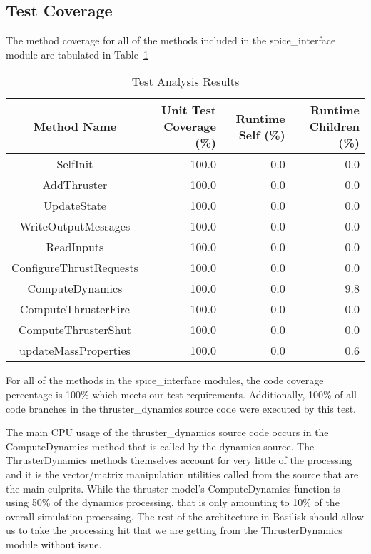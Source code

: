 \subsection{Test Coverage}
The method coverage for all of the methods included in the spice\_interface 
module are tabulated in Table~\ref{tab:cov_met}

\begin{table}[htbp]
	\caption{Test Analysis Results}
	\label{tab:cov_met}
	\centering \fontsize{10}{10}\selectfont
	\begin{tabular}{c | r | r | r} %
		\hline
		Method Name    & Unit Test Coverage (\%) & Runtime Self (\%) & Runtime Children (\%) \\
		\hline
		SelfInit & 100.0 & 0.0 & 0.0 \\
		AddThruster & 100.0 & 0.0 & 0.0 \\
		UpdateState & 100.0 & 0.0 & 0.0 \\
		WriteOutputMessages & 100.0 & 0.0 & 0.0 \\
		ReadInputs & 100.0 & 0.0 & 0.0 \\
		ConfigureThrustRequests & 100.0 & 0.0 & 0.0 \\
		ComputeDynamics & 100.0 & 0.0 & 9.8 \\
		ComputeThrusterFire & 100.0 & 0.0 & 0.0 \\
		ComputeThrusterShut & 100.0 & 0.0 & 0.0 \\
		updateMassProperties & 100.0 & 0.0 & 0.6 \\
		\hline
	\end{tabular}
\end{table}

For all of the methods in the spice\_interface modules, the code coverage 
percentage is 100\% which meets our test requirements.  Additionally, 100\% of 
all code branches in the thruster\_dynamics source code were executed by this 
test.


The main CPU usage of the thruster\_dynamics source code occurs in the 
ComputeDynamics method that is called by the dynamics source.  The 
ThrusterDynamics methods themselves account for very little of the processing 
and it is the vector/matrix manipulation utilities called from the source that 
are the main culprits.  While the thruster model's ComputeDynamics function is 
using 50\% of the dynamics processing, that is only amounting to 10\% of the 
overall simulation processing.  The rest of the architecture in Basilisk should 
allow us to take the processing hit that we are getting from the 
ThrusterDynamics module without issue.

